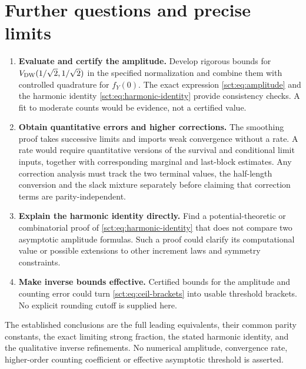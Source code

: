 \documentclass[11pt,letterpaper]{article}
\theoremstyle{definition}\newtheorem{remark}[theorem]{Remark}
\newcommand{\fY}{f_Y}\newcommand{\code}[1]{\texttt{#1}}
\begin{document}
\section{Further questions and precise limits}\label{sct:sec:questions}
\begin{enumerate}
\item \textbf{Evaluate and certify the amplitude.}
Develop rigorous bounds for $V_{\mathrm{DW}}(1/\sqrt2,1/\sqrt2)$ in the specified
normalization and combine them with controlled quadrature for $\fY(0)$.
The exact expression \eqref{sct:eq:amplitude} and the harmonic identity
\eqref{sct:eq:harmonic-identity} provide consistency checks. A fit to moderate
counts would be evidence, not a certified value.
\item \textbf{Obtain quantitative errors and higher corrections.}
The smoothing proof takes successive limits and imports weak convergence
without a rate. A rate would require quantitative versions of the survival
and conditional limit inputs, together with corresponding marginal and
last-block estimates. Any correction analysis must track the two terminal
values, the half-length conversion and the slack mixture separately before
claiming that correction terms are parity-independent.
\item \textbf{Explain the harmonic identity directly.}
Find a potential-theoretic or combinatorial proof of
\eqref{sct:eq:harmonic-identity} that does not compare two asymptotic amplitude
formulas. Such a proof could clarify its computational value or possible
extensions to other increment laws and symmetry constraints.
\item \textbf{Make inverse bounds effective.}
Certified bounds for the amplitude and counting error could turn
\eqref{sct:eq:ceil-brackets} into usable threshold brackets. No explicit
rounding cutoff is supplied here.
\end{enumerate}
The established conclusions are the full leading equivalents, their common
parity constants, the exact limiting strong fraction, the stated harmonic
identity, and the qualitative inverse refinements. No numerical amplitude,
convergence rate, higher-order counting coefficient or effective asymptotic
threshold is asserted.
\end{document}
